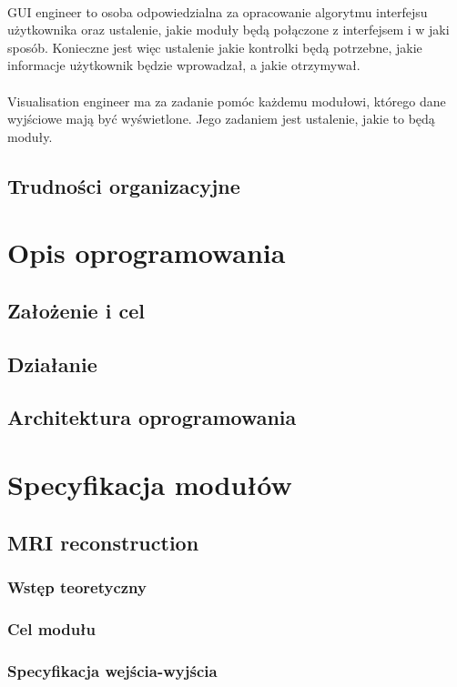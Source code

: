 \documentclass[12]{article}
\begin{document}
	\paragraph{}
	GUI engineer to osoba odpowiedzialna za opracowanie algorytmu interfejsu użytkownika oraz ustalenie, jakie moduły będą połączone z interfejsem i w jaki sposób. Konieczne jest więc ustalenie jakie kontrolki będą potrzebne, jakie informacje użytkownik będzie wprowadzał, a jakie otrzymywał.
	\paragraph{}
	Visualisation engineer ma za zadanie pomóc każdemu modułowi, którego dane wyjściowe mają być wyświetlone. Jego zadaniem jest ustalenie, jakie to będą moduły.
	
	\subsection{Trudności organizacyjne}
	\newpage
	\section{Opis oprogramowania}
	\subsection{Założenie i cel}
	\subsection{Działanie}
	\subsection{Architektura oprogramowania}
	\newpage
	\section{Specyfikacja modułów}
	\subsection{MRI reconstruction}
		\subsubsection{Wstęp teoretyczny}
		\subsubsection{Cel modułu}
		\subsubsection{Specyfikacja wejścia-wyjścia}
\end{document}
